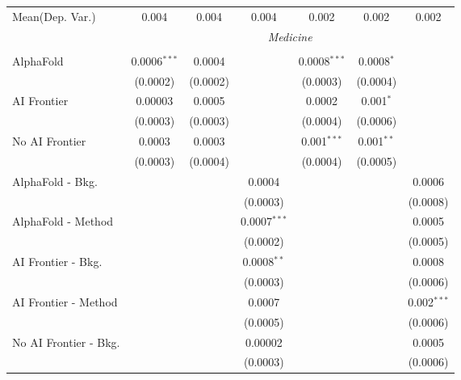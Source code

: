 \begin{tabular}{lcccccc}
Mean(Dep. Var.) & 0.004 & 0.004 & 0.004 & 0.002 & 0.002 & 0.002 \\
 & \multicolumn{6}{c}{\textit{Medicine}} \\ \\
   AlphaFold               & 0.0006$^{***}$ & 0.0004   &                & 0.0008$^{***}$ & 0.0008$^{*}$ &   \\   
                           & (0.0002)       & (0.0002) &                & (0.0003)       & (0.0004)     &   \\   
   AI Frontier             & 0.00003        & 0.0005   &                & 0.0002         & 0.001$^{*}$  &   \\   
                           & (0.0003)       & (0.0003) &                & (0.0004)       & (0.0006)     &   \\   
   No AI Frontier          & 0.0003         & 0.0003   &                & 0.001$^{***}$  & 0.001$^{**}$ &   \\   
                           & (0.0003)       & (0.0004) &                & (0.0004)       & (0.0005)     &   \\   
   AlphaFold - Bkg.        &                &          & 0.0004         &                &              & 0.0006\\   
                           &                &          & (0.0003)       &                &              & (0.0008)\\   
   AlphaFold - Method      &                &          & 0.0007$^{***}$ &                &              & 0.0005\\   
                           &                &          & (0.0002)       &                &              & (0.0005)\\   
   AI Frontier - Bkg.      &                &          & 0.0008$^{**}$  &                &              & 0.0008\\   
                           &                &          & (0.0003)       &                &              & (0.0006)\\   
   AI Frontier - Method    &                &          & 0.0007         &                &              & 0.002$^{***}$\\   
                           &                &          & (0.0005)       &                &              & (0.0006)\\   
   No AI Frontier - Bkg.   &                &          & 0.00002        &                &              & 0.0005\\   
                           &                &          & (0.0003)       &                &              & (0.0006)\\   

\end{tabular}
